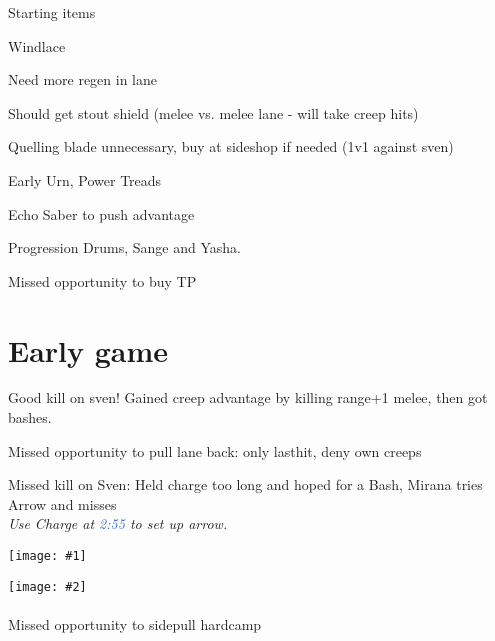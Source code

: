 \documentclass{article}
\newcommand{\gt}{\ensuremath{\;\;\color{green} \filledmedtriangleup} }
\newcommand{\rt}{\ensuremath{\;\;\color{red} \filledmedtriangledown} }
\newcommand{\ws}{\ensuremath{\;\;\color{white} \filledmedsquare} }
\newenvironment{remarks}
    {
        \begin{description}
            \setlength\itemsep{0em}
    }
    {
        \end{description}
    }
\newcommand{\goodremark}[1]{\item[\gt] #1}
\newcommand{\neutralremark}[1]{\item[\ws] #1}
\newcommand{\badremark}[1]{\item[\rt] #1}
\newcommand{\logremark}[2]{\item[\textnormal{\logref{#1}}] #2}
\newcommand{\suggestion}[1]{\\ \emph{#1}}
\newcommand{\logref}[1]{\textcolor{highlight}{#1}}
\newcommand{\twoscreenshots}[2]{
\begin{center}
    \begin{minipage}[t]{0.4\textwidth}
        \begin{center}
            \texttt{[image: \#1]}
            \end{center}
    \end{minipage}
    \begin{minipage}[t]{0.4\textwidth}
            \begin{center}
        \texttt{[image: \#2]}
                \paragraph{}\hfill
            \end{center}
    \end{minipage}
\end{center}
}
\begin{document}
\begin{remarks}
\neutralremark{Starting items
\begin{remarks}
\goodremark{Windlace}
\badremark{Need more regen in lane}
\badremark{Should get stout shield (melee vs. melee lane - will take creep hits)}
\badremark{Quelling blade unnecessary, buy at sideshop if needed (1v1 against sven)}
\end{remarks}
    }
\goodremark{Early Urn, Power Treads}
\goodremark{Echo Saber to push advantage}
\neutralremark{Progression Drums, Sange and Yasha.}

\logremark{19:05} {Missed opportunity to buy TP}
\end{remarks}


\section{Early game}

    
\begin{remarks}

    \logremark{1:53}{Good kill on sven! Gained creep advantage by killing range+1 melee, then got bashes.}
    \logremark{1:58}{Missed opportunity to pull lane back: 
    only lasthit, deny own creeps}
    \logremark{2:58}{Missed kill on Sven: Held charge too long and hoped for a Bash, Mirana tries Arrow and misses
    \suggestion{Use Charge at \logref{2:55} to set up arrow.}\twoscreenshots{img/255.jpg}{img/257.jpg}}
    \logremark{3:20}{Missed opportunity to sidepull hardcamp}
   
\end{remarks}

\pagebreak
\end{document}
